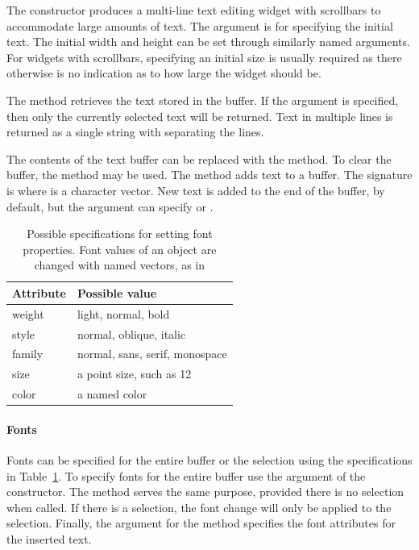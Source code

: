 The  constructor produces a multi-line text editing
widget with scrollbars to accommodate large amounts of text. The
 argument is for specifying the initial text. The
initial width and height can be set through similarly named
arguments. For widgets with scrollbars, specifying an initial size is
usually required as there otherwise is no indication as to how large
the widget should be.

The  method retrieves the text stored in the
buffer. If the argument  is specified, then only the
currently selected text will be returned. Text in multiple lines is
returned as a single string with \qcode{\backslashn} separating the lines.

The contents of the text buffer can be replaced with the
 method. To clear the buffer, the
 method may be used. The 
method adds text to a buffer. The signature is 
where  is a character vector. New text is added to the end
of the buffer, by default, but the  argument
can specify  or .





\begin{table}
\centering
\label{tab:gWidgets-font-properties}
\caption{Possible specifications for setting font properties. Font values of an object are changed with named vectors, as in }
\begin{tabular}{@{}lp{}@{}}
\toprule

Attribute&Possible value\\
\midrule
weight&light, normal, bold\\style&normal, oblique, italic\\family&normal, sans, serif, monospace\\size&a point size, such as 12\\color&a named color
\\ \bottomrule
\end{tabular}
\end{table}
\paragraph{Fonts}
Fonts can be specified for the entire buffer or the selection using
the specifications in Table~\ref{tab:gWidgets-font-properties}. To
specify fonts for the entire buffer use the
 argument of the constructor. The
 method serves the same purpose, provided
there is no selection when called. If there is a selection, the font
change will only be applied to the selection. Finally, the
 argument for the  method
specifies the font attributes for the inserted text.
\\


